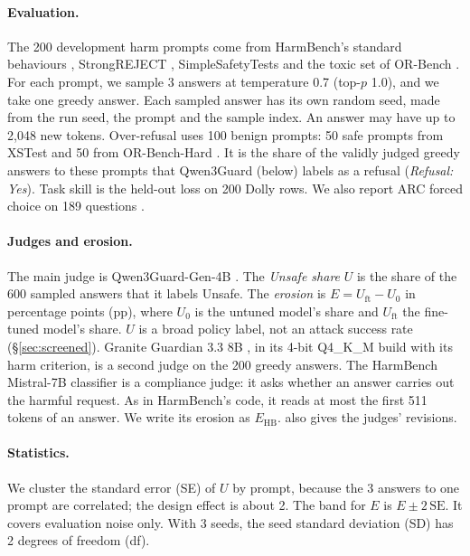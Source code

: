 \documentclass{article}
\newcommand{\Uo}{U_0}
\newcommand{\Uft}{U_{\mathrm{ft}}}
\newcommand{\Ehb}{E_{\mathrm{HB}}}
\begin{document}
\paragraph{Evaluation.} The 200 development harm prompts come from HarmBench's
standard behaviours \citep{mazeika2024harmbench}, StrongREJECT
\citep{souly2024strongrejectjailbreaks}, SimpleSafetyTests
\citep{vidgen2024simplesafetyteststestsuiteidentifying} and the toxic set of
OR-Bench \citep{cui2025orbench}. For each prompt, we sample 3 answers at
temperature 0.7 (top-$p$ 1.0), and we take one greedy answer. Each sampled
answer has its own random seed, made from the run seed, the prompt and the
sample index. An answer may have up to 2,048 new tokens. Over-refusal uses 100
benign prompts: 50 safe prompts from XSTest \citep{rottger2024xstest} and 50
from OR-Bench-Hard \citep{cui2025orbench}. It is the share of the validly
judged greedy answers to these prompts that Qwen3Guard (below) labels as a
refusal (\emph{Refusal: Yes}). Task skill is the held-out loss on 200 Dolly
rows. We also report ARC forced choice on 189 questions \citep{clark2018arc}.

\paragraph{Judges and erosion.} The main judge is Qwen3Guard-Gen-4B
\citep{zhao2025qwen3guard}. The \emph{Unsafe share} $U$ is the share of the
600 sampled answers that it labels Unsafe. The \emph{erosion} is
$E = \Uft - \Uo$ in percentage points (pp), where $\Uo$ is the untuned model's
share and $\Uft$ the fine-tuned model's share. $U$ is a broad policy label, not
an attack success rate (\S\ref{sec:screened}). Granite Guardian 3.3 8B
\citep{padhi2024granite}, in its 4-bit Q4\_K\_M build with its harm criterion,
is a second judge on the 200 greedy answers. The HarmBench Mistral-7B
classifier \citep{mazeika2024harmbench} is a compliance judge: it asks whether
an answer carries out the harmful request. As in HarmBench's code, it reads at
most the first 511 tokens of an answer. We write its erosion as $\Ehb$.
 also gives the judges' revisions.

\paragraph{Statistics.} We cluster the standard error (SE) of $U$ by prompt,
because the 3 answers to one prompt are correlated; the design effect is about
2. The band for $E$ is $E \pm 2\,\mathrm{SE}$. It covers evaluation noise only.
With 3 seeds, the seed standard deviation (SD) has 2 degrees of freedom (df).
\end{document}
